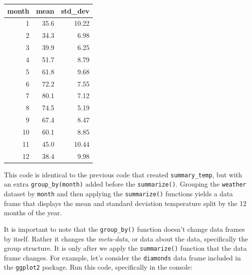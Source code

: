 \documentclass[12pt, krantz2,]{krantz}
\makeatletter
\newenvironment{Shaded}{\begin{snugshade}}{\end{snugshade}}
\newcommand{\DataTypeTok}[1]{\textcolor[rgb]{0.27,0.27,0.27}{#1}}
\newcommand{\KeywordTok}[1]{\textcolor[rgb]{0.27,0.27,0.27}{\textbf{#1}}}
\newcommand{\NormalTok}[1]{#1}
\newcommand{\OperatorTok}[1]{\textcolor[rgb]{0.43,0.43,0.43}{\textbf{#1}}}
\newcommand{\OtherTok}[1]{\textcolor[rgb]{0.37,0.37,0.37}{#1}}
\newcommand{\StringTok}[1]{\textcolor[rgb]{0.5,0.5,0.5}{#1}}
\newenvironment{kframe}{%
\medskip{}
\setlength{\fboxsep}{.8em}
 \def\at@end@of@kframe{}%
 \ifinner\ifhmode%
  \def\at@end@of@kframe{\end{minipage}}%
  \begin{minipage}{\columnwidth}%
 \fi\fi%
 \def\FrameCommand##1{\hskip\@totalleftmargin \hskip-\fboxsep
 \colorbox{shadecolor}{##1}\hskip-\fboxsep
     \hskip-\linewidth \hskip-\@totalleftmargin \hskip\columnwidth}%
 \MakeFramed {\advance\hsize-\width
   \@totalleftmargin\z@ \linewidth\hsize
   \@setminipage}}%
 {\par\unskip\endMakeFramed%
 \at@end@of@kframe}
\renewenvironment{Shaded}{\begin{kframe}}{\end{kframe}}
\makeatother
\begin{document}
\begin{Shaded}
\end{Shaded}

\begin{table}[H]
\centering\begingroup\fontsize{10}{12}\selectfont

\begin{tabular}{r|r|r}
\hline
month & mean & std\_dev\\
\hline
1 & 35.6 & 10.22\\
\hline
2 & 34.3 & 6.98\\
\hline
3 & 39.9 & 6.25\\
\hline
4 & 51.7 & 8.79\\
\hline
5 & 61.8 & 9.68\\
\hline
6 & 72.2 & 7.55\\
\hline
7 & 80.1 & 7.12\\
\hline
8 & 74.5 & 5.19\\
\hline
9 & 67.4 & 8.47\\
\hline
10 & 60.1 & 8.85\\
\hline
11 & 45.0 & 10.44\\
\hline
12 & 38.4 & 9.98\\
\hline
\end{tabular}
\endgroup{}
\end{table}

This code is identical to the previous code that created \texttt{summary\_temp}, but with an extra \texttt{group\_by(month)} added before the \texttt{summarize()}. Grouping the \texttt{weather} dataset by \texttt{month} and then applying the \texttt{summarize()} functions yields a data frame that displays the mean and standard deviation temperature split by the 12 months of the year.

It is important to note that the \texttt{group\_by()} function doesn't change data frames by itself. Rather it changes the \emph{meta-data}, or data about the data, specifically the group structure. It is only after we apply the \texttt{summarize()} function that the data frame changes. For example, let's consider the \texttt{diamonds} data frame included in the \texttt{ggplot2} package. Run this code, specifically in the console:
\end{document}
